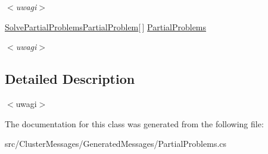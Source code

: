 \begin{DoxyCompactItemize}
\begin{DoxyCompactList}\small\item\em $<$uwagi$>$ \end{DoxyCompactList}\item 
\hypertarget{class_solve_partial_problems_a3731e0e9ce8a0aa0f984a16433f2e22c}{}\hyperlink{class_solve_partial_problems_partial_problem}{Solve\+Partial\+Problems\+Partial\+Problem}\mbox{[}$\,$\mbox{]} \hyperlink{class_solve_partial_problems_a3731e0e9ce8a0aa0f984a16433f2e22c}{Partial\+Problems}\label{class_solve_partial_problems_a3731e0e9ce8a0aa0f984a16433f2e22c}

\begin{DoxyCompactList}\small\item\em $<$uwagi$>$ \end{DoxyCompactList}\end{DoxyCompactItemize}


\subsection{Detailed Description}
$<$uwagi$>$ 

The documentation for this class was generated from the following file\+:\begin{DoxyCompactItemize}
\item 
src/\+Cluster\+Messages/\+Generated\+Messages/Partial\+Problems.\+cs\end{DoxyCompactItemize}
